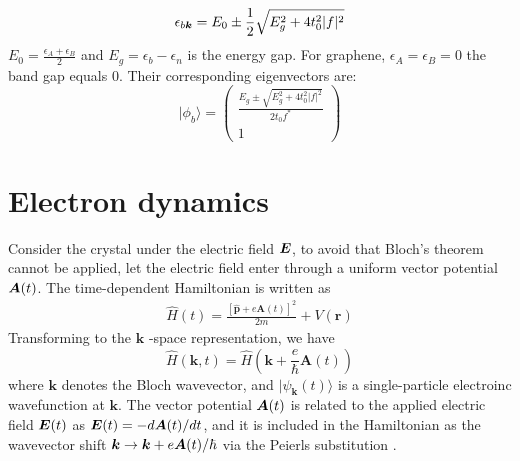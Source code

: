 \begin{equation}
\epsilon_{b\boldsymbol{k}}=E_{0} \pm \frac{1}{2} \sqrt{E_{g}^{2}+4t_{0}^{2}|f|^{2}}
\label{eigenvalues}
\end{equation}
$E_{0}=\frac{\epsilon_{A}+\epsilon_{B}}{2}$ and $E_{g}=\epsilon_{b}-\epsilon_{n}$ is the energy gap. For graphene, $\epsilon_{A} = \epsilon_{B} =0$ the band gap equals 0.
Their corresponding eigenvectors are:
\begin{equation}
    |\phi_{b}\rangle  =\left(\begin{array}{cc}
 \frac{E_{g} \pm \sqrt{E_{g}^{2}+4t_{0}^{2}|f|^{2}}}{2t_{0} f^*}\\
1
\end{array}\right)
\label{eqn:eigenvector}
\end{equation}

\section{Electron dynamics}
Consider the crystal under the electric field $\boldsymbol {E}$, to avoid that
Bloch’s theorem cannot be applied, let the electric field enter through a uniform vector potential $\boldsymbol {A} (t)$. The time-dependent Hamiltonian is written as
\begin{align}
\hat{H}(t)=\frac{[\hat{\boldsymbol{p}}+e \boldsymbol{A}(t)]^{2}}{2 m}+V(\boldsymbol{r})
\end{align}
Transforming to the $\boldsymbol{k}$ -space representation, we have
\begin{equation}
     \hat{H}(\boldsymbol{k}, t)=\hat{H}\left(\boldsymbol{k}+\frac{e}{\hbar} \boldsymbol{A}(t)\right)
     \label{eqn:vTD}
\end{equation}
where $\boldsymbol k$ denotes the Bloch wavevector, and $|\psi_{\boldsymbol k}(t)\rangle$ is a single-particle electroinc wavefunction at $\boldsymbol k$. The vector potential $\boldsymbol A(t)$ is related to the applied electric field $\boldsymbol E(t)$ as $\boldsymbol E(t)=-d\boldsymbol A(t)/dt$, and it is included in the Hamiltonian as the wavevector shift $\boldsymbol k \rightarrow \boldsymbol k + e\boldsymbol A(t)/\hbar$ via the Peierls substitution  \cite{hofstadter1976energy}.\\
